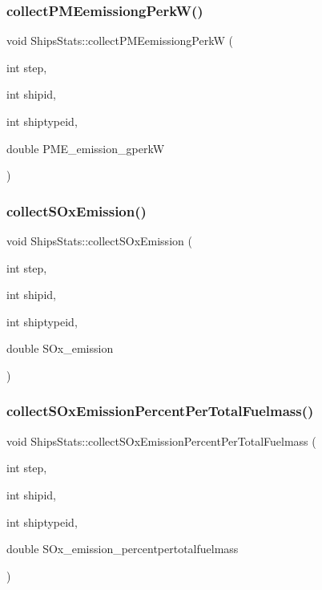 \mbox{\label{class_ships_stats_a4c617367fe73aca1eb33514b1984acdf}} 
\subsubsection{\texorpdfstring{collectPMEemissiongPerkW()}{collectPMEemissiongPerkW()}}
{\footnotesize\ttfamily void Ships\+Stats\+::collect\+P\+M\+Eemissiong\+PerkW (\begin{DoxyParamCaption}\item[{int}]{step,  }\item[{int}]{shipid,  }\item[{int}]{shiptypeid,  }\item[{double}]{P\+M\+E\+\_\+emission\+\_\+gperkW }\end{DoxyParamCaption})}

\mbox{\label{class_ships_stats_a23b7670d4073d50e777ad69cd0c3593d}} 
\subsubsection{\texorpdfstring{collectSOxEmission()}{collectSOxEmission()}}
{\footnotesize\ttfamily void Ships\+Stats\+::collect\+S\+Ox\+Emission (\begin{DoxyParamCaption}\item[{int}]{step,  }\item[{int}]{shipid,  }\item[{int}]{shiptypeid,  }\item[{double}]{S\+Ox\+\_\+emission }\end{DoxyParamCaption})}

\mbox{\label{class_ships_stats_a304f65fd6dcc56d14d324ec24677dca6}} 
\subsubsection{\texorpdfstring{collectSOxEmissionPercentPerTotalFuelmass()}{collectSOxEmissionPercentPerTotalFuelmass()}}
{\footnotesize\ttfamily void Ships\+Stats\+::collect\+S\+Ox\+Emission\+Percent\+Per\+Total\+Fuelmass (\begin{DoxyParamCaption}\item[{int}]{step,  }\item[{int}]{shipid,  }\item[{int}]{shiptypeid,  }\item[{double}]{S\+Ox\+\_\+emission\+\_\+percentpertotalfuelmass }\end{DoxyParamCaption})}

